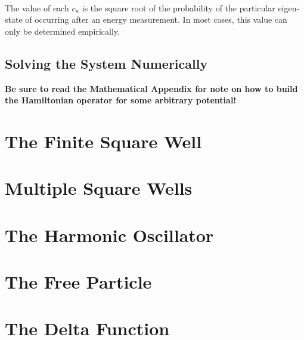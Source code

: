 \documentclass[12pt,letterpaper]{book}
\begin{document}
\paragraph*{}The value of each $c_n$ is the square root of the probability of the particular eigen-state of occurring after an energy measurement. In most cases, this value can only be determined empirically.


\subsection*{Solving the System Numerically}
\textbf{Be sure to read the Mathematical Appendix for note on how to build the Hamiltonian operator for some arbitrary potential!}



\section{The Finite Square Well}


\section{Multiple Square Wells}



\section{The Harmonic Oscillator}



\section{The Free Particle}



\section{The Delta Function}




\end{document}
